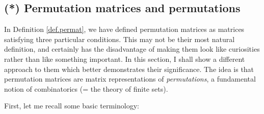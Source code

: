 \documentclass[numbers=enddot,12pt,final,onecolumn,notitlepage]{scrartcl}%
\theoremstyle{definition}
\begin{document}
\subsection{\label{sect.gauss.permat.perms}(*) Permutation matrices and
permutations}

In Definition \ref{def.permat}, we have defined permutation matrices as
matrices satisfying three particular conditions. This may not be their most
natural definition, and certainly has the disadvantage of making them look
like curiosities rather than like something important. In this section, I
shall show a different approach to them which better demonstrates their
significance. The idea is that permutation matrices are matrix representations
of \textit{permutations}, a fundamental notion of combinatorics (= the theory
of finite sets).

First, let me recall some basic terminology:
\end{document}

